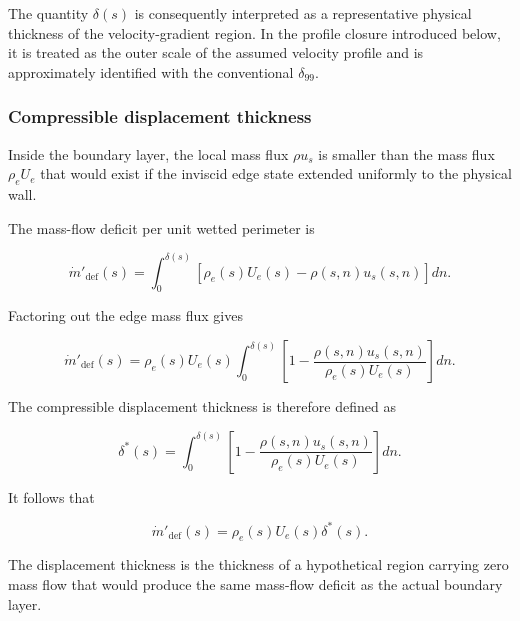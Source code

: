 The quantity \(\delta(s)\) is consequently interpreted as a representative
physical thickness of the velocity-gradient region. In the profile closure
introduced below, it is treated as the outer scale of the assumed velocity
profile and is approximately identified with the conventional
\(\delta_{99}\).

\subsubsection{Compressible displacement thickness}

Inside the boundary layer, the local mass flux \(\rho u_s\) is smaller than
the mass flux \(\rho_eU_e\) that would exist if the inviscid edge state
extended uniformly to the physical wall.

The mass-flow deficit per unit wetted perimeter is

\begin{equation}
    \dot{m}'_{\mathrm{def}}(s)
    =
    \int_0^{\delta(s)}
    \left[
        \rho_e(s)U_e(s)
        -
        \rho(s,n)u_s(s,n)
    \right]dn.
    \label{eq:mass_flow_deficit}
\end{equation}

Factoring out the edge mass flux gives

\begin{equation}
    \dot{m}'_{\mathrm{def}}(s)
    =
    \rho_e(s)U_e(s)
    \int_0^{\delta(s)}
    \left[
        1-
        \frac{
            \rho(s,n)u_s(s,n)
        }{
            \rho_e(s)U_e(s)
        }
    \right]dn.
\end{equation}

The compressible displacement thickness is therefore defined as

\begin{equation}
    \boxed{
    \delta^*(s)
    =
    \int_0^{\delta(s)}
    \left[
        1-
        \frac{
            \rho(s,n)u_s(s,n)
        }{
            \rho_e(s)U_e(s)
        }
    \right]dn
    }.
    \label{eq:compressible_displacement_thickness}
\end{equation}

It follows that

\begin{equation}
    \boxed{
    \dot{m}'_{\mathrm{def}}(s)
    =
    \rho_e(s)U_e(s)\delta^*(s)
    }.
    \label{eq:mass_deficit_displacement}
\end{equation}

The displacement thickness is the thickness of a hypothetical region carrying
zero mass flow that would produce the same mass-flow deficit as the actual
boundary layer.

